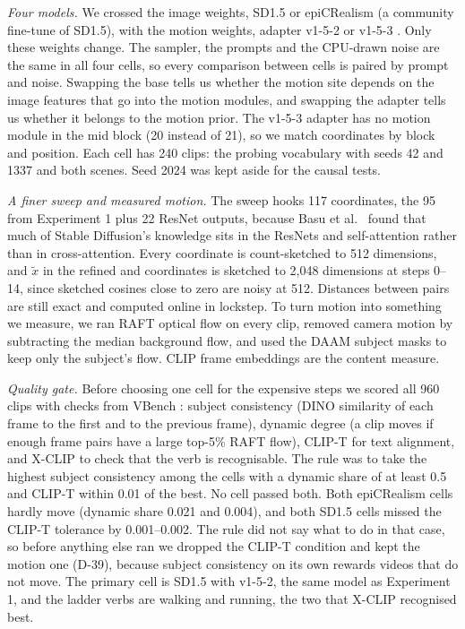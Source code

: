 \documentclass[twoside,english]{article}
\newcommand{\xd}{\tilde{x}}       %
\begin{document}
\emph{Four models.} We crossed the image weights, SD1.5 or epiCRealism \citep{hf_epicrealism} (a
community fine-tune of SD1.5), with the motion weights, adapter \mbox{v1-5-2} or \mbox{v1-5-3}
\citep{hf_animatediff_v3}. Only these weights change. The sampler, the prompts and the CPU-drawn noise
are the same in all four cells, so every comparison between cells is paired by prompt and noise.
Swapping the base tells us whether the motion site depends on the image features that go into the
motion modules, and swapping the adapter tells us whether it belongs to the motion prior. The \mbox{v1-5-3} adapter has
no motion module in the mid block (20 instead of 21), so we match coordinates by block and position.
Each cell has 240 clips: the probing vocabulary with seeds 42 and 1337 and both scenes. Seed 2024 was
kept aside for the causal tests.

\emph{A finer sweep and measured motion.} The sweep hooks 117 coordinates, the 95 from Experiment 1
plus 22 ResNet outputs, because Basu et al.\ \citep{basu2024localizing} found that much of Stable
Diffusion's knowledge sits in the ResNets and self-attention rather than in cross-attention. Every
coordinate is count-sketched to 512 dimensions, and $\xd$ in the refined  and
 coordinates is sketched to 2{,}048 dimensions at steps 0--14, since sketched cosines
close to zero are noisy at 512. Distances between pairs are still exact and computed online in
lockstep. To turn motion into something we measure, we ran RAFT optical flow \citep{teed2020raft} on
every clip, removed camera motion by subtracting the median background flow, and used the DAAM subject
masks to keep only the subject's flow. CLIP frame embeddings are the content measure.

\emph{Quality gate.} Before choosing one cell for the expensive steps we scored all 960 clips with
checks from VBench \citep{huang2024vbench}: subject consistency (DINO \citep{caron2021dino} similarity
of each frame to the first and to the previous frame), dynamic degree (a clip moves if enough frame
pairs have a large top-5\% RAFT flow), CLIP-T for text alignment, and X-CLIP \citep{ni2022xclip} to
check that the verb is recognisable. The rule was to take the highest subject consistency among the
cells with a dynamic share of at least 0.5 and CLIP-T within 0.01 of the best. No cell passed both.
Both epiCRealism cells hardly move (dynamic share 0.021 and 0.004), and both SD1.5 cells missed the
CLIP-T tolerance by 0.001--0.002. The rule did not say what to do in that case, so before anything
else ran we dropped the CLIP-T condition and kept the motion one (D-39), because subject consistency
on its own rewards videos that do not move. The primary cell is SD1.5 with \mbox{v1-5-2}, the same model as
Experiment 1, and the ladder verbs are walking and running, the two that X-CLIP recognised best.
\end{document}
